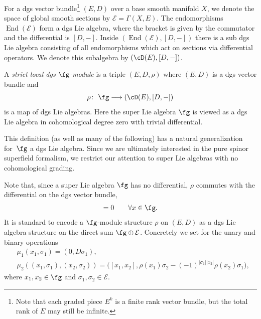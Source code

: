 \documentclass[10pt,a4paper]{amsart}
\numberwithin{equation}{section}
\def\cE{\mathcal E}\def\cF{\mathcal F}\def\cG{\mathcal G}\def\cH{\mathcal H}
\DeclareMathOperator{\End}{End}
\begin{document}
For a dgs vector bundle\footnote{Note that each graded piece $E^k$ is a finite rank vector bundle, but the total rank of $E$ may still be infinite.} $(E,D)$ over a base smooth manifold $X$, we denote the space of global smooth sections by $\cE = \Gamma(X,E)$. The endomorphisms $\End(\cE)$ form a dgs Lie algebra, where the bracket is given by the commutator and the differential is $[D,-]$. Inside $(\End(\cE), [D,-])$ there is a sub dgs Lie algebra consisting of all endomorphisms which act on sections via differential operators. We denote this subalgebra by $(\cD(E), [D,-])$.
\begin{dfn}
	A \emph{strict local dgs $\fg$-module} is a triple $(E,D,\rho)$ where $(E,D)$ is a dgs vector bundle and
	\begin{equation*}
	\rho \colon \ \fg \longrightarrow (\cD(E) , [D,-] )
	\end{equation*}
	is a map of dgs Lie algebras. Here the super Lie algebra $\fg$ is viewed as a dgs Lie algebra in cohomological degree zero with trivial differential.
\end{dfn}
\begin{rmk}
	This definition (as well as many of the following) has a natural generalization for~$\fg$ a dgs Lie algebra. Since we are ultimately interested in the pure spinor superfield formalism, we restrict our attention to super Lie algebras with no cohomological grading.
\end{rmk}
Note that, since a super Lie algebra $\fg$ has no differential, $\rho$ commutes with the differential on the dgs vector bundle,
\begin{equation*}
[D,\rho(x)] = 0 \qquad \forall x \in \fg .
\end{equation*}
It is standard to encode a $\fg$-module structure $\rho$ on $(E,D)$ as a dgs Lie algebra structure on the direct sum $\fg \oplus \cE$. Concretely we set for the unary and binary operations
\begin{align}
&\mu_1(x_1,\sigma_1) = (0, D\sigma_1),\nonumber \\
&\mu_2((x_1,\sigma_1),(x_2,\sigma_2)) = \big([x_1,x_2] , \rho(x_1)\sigma_2 - (-1)^{|\sigma_1| |x_2|} \rho(x_2)\sigma_1 \big) ,\label{eq: lie structure on sum}
\end{align}
where $x_1,x_2 \in \fg$ and $\sigma_1,\sigma_2 \in \cE$.
\end{document}
